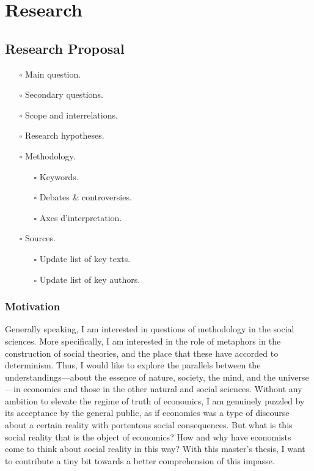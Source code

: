 \documentclass[paper=A4,portrait,twoside=true,twocolumn=true,headinclude=false,footinclude=false,fontsize=10,BCOR=15mm,DIV=13,pagesize=auto,titlepage=firstiscover,mpinclude=true,headings=twolinechapter,open=right,chapterprefix=false,numbers=noendperiod,headsepline=false,parskip=false]{scrbook}
\theoremstyle{definition}
\begin{document}
\part{Research}
\label{sec:orgf4c29f5}
\chapter{Research Proposal}
\label{sec:org73a8ab1}
\begin{itemize}
\item[{$\square$}] Main question.
\item[{$\square$}] Secondary questions.
\item[{$\square$}] Scope and interrelations.
\item[{$\square$}] Research hypotheses.
\item[{$\square$}] Methodology.
\begin{itemize}
\item[{$\square$}] Keywords.
\item[{$\square$}] Debates \& controversies.
\item[{$\square$}] Axes d'interpretation.
\end{itemize}
\item[{$\square$}] Sources.
\begin{itemize}
\item[{$\square$}] Update list of key texts.
\item[{$\square$}] Update list of key authors.
\end{itemize}
\end{itemize}
\section{Motivation}
\label{sec:org410c653}
Generally speaking, I am interested in questions of methodology in the
social sciences. More specifically, I am interested in the role of
metaphors in the construction of social theories, and the place that these
have accorded to determinism. Thus, I would like to explore the parallels
between the understandings---about the essence of nature, society, the
mind, and the universe---in economics and those in the other natural and
social sciences. Without any ambition to elevate the regime of truth of
economics, I am genuinely puzzled by its acceptance by the general public,
as if economics was a type of discourse about a certain reality with
portentous social consequences. But what is this social reality that is the
object of economics? How and why have economists come to think about social
reality in this way? With this master's thesis, I want to contribute a tiny
bit towards a better comprehension of this impasse.
\end{document}

